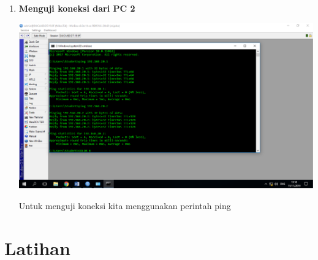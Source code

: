 \documentclass[a4paper,12pt]{article}
\begin{document}
\begin{enumerate}
	\item \textbf{Menguji koneksi dari PC 2}
	\begin{center}
		\includegraphics[scale=.38]{Page-4-Image-7}
	\end{center}
	Untuk menguji koneksi kita menggunakan perintah ping
	
	
\end{enumerate}

\section{Latihan}
\end{document}
